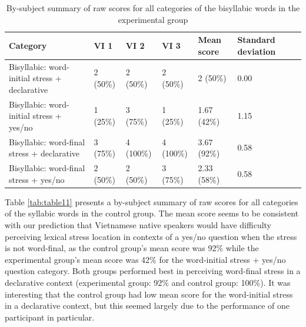 \documentclass[a4paper]{article}
\begin{document}
\begin{table}[H]
  \begin{center}
    \caption{By-subject summary of raw scores for all categories of the bisyllabic words in the experimental group}
    \label{tab:table10}
      \begin{tabular}{|p{2cm}|p{2cm}|p{2cm}|p{2cm}|p{2cm}|p{2cm}|p{2cm}}
            \hline
         Category  & VI 1 & VI 2 & VI 3 & Mean score & Standard deviation  \\
      \hline
     Bisyllabic: word-initial stress + declarative & 2 (50\%)&  2 (50\%) &  2 (50\%) & 2 (50\%) & 0.00 \\
      \hline
     Bisyllabic: word-initial stress + yes/no & 1 (25\%) & 3 (75\%)  & 1 (25\%) & 1.67 (42\%) & 1.15 \\
      \hline
     Bisyllabic: word-final stress + declarative & 3 (75\%) & 4 (100\%) & 4 (100\%) & 3.67 (92\%) & 0.58\\
           \hline
     Bisyllabic: word-final stress + yes/no &  2 (50\%) &  2 (50\%) & 3 (75\%) & 2.33 (58\%) & 0.58 \\
     
     \hline
    \end{tabular}
  \end{center}
\end{table}

Table \ref{tab:table11} presents a by-subject summary of raw scores for all categories of the syllabic words in the control group. The mean score seems to be consistent with our prediction that Vietnamese native speakers would have difficulty perceiving lexical stress location in contexts of a yes/no question when the stress is not word-final, as the control group's mean score was 92\% while the experimental group's mean score was 42\% for the word-initial stress + yes/no question category. Both groups performed best in perceiving word-final stress in a declarative context (experimental group: 92\% and control group: 100\%). It was interesting that the control group had low mean score for the word-initial stress in a declarative context, but this seemed largely due to the performance of one participant in particular.
\end{document}

